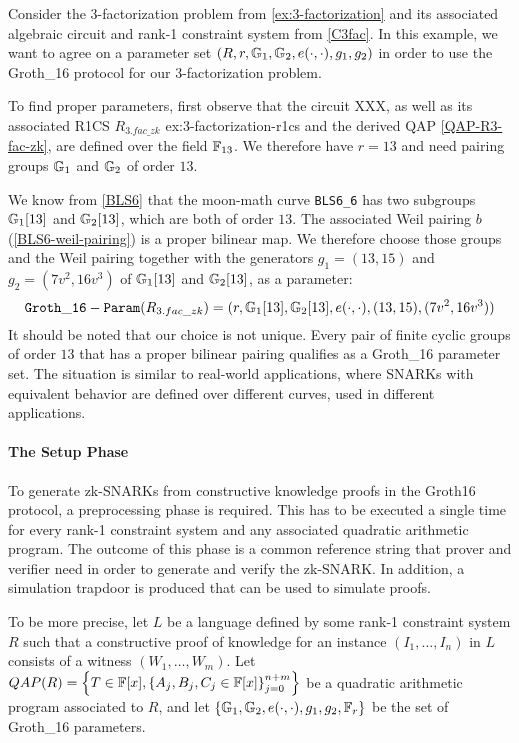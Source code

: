 \begin{example} Consider the $3$-factorization problem from \ref{ex:3-factorization} and its associated algebraic circuit and rank-1 constraint system from  \ref{C3fac}. In this example, we want to agree on a parameter set $(R,r, \mathbb{G}_1, \mathbb{G}_2, e(\cdot,\cdot), g_1,g_2)$ in order to use the Groth\_16 protocol for our $3$-factorization problem. 

To find proper parameters, first observe that the circuit XXX, as well as its associated R1CS $R_{3.fac\_zk}$ {ex:3-factorization-r1cs} and the derived QAP \ref{QAP-R3-fac-zk}, are defined over the field $\mathbb{F}_{13}$. We therefore have $r=13$ and need pairing groups $\mathbb{G}_1$ and $\mathbb{G}_2$ of order $13$. 

We know from \ref{BLS6} that the moon-math curve \texttt{BLS6\_6} has two subgroups $\mathbb{G}_1[13]$ and $\mathbb{G}_2[13]$, which are both of order $13$. The associated Weil pairing $b$ (\ref{BLS6-weil-pairing}) is a proper bilinear map. We therefore choose those groups and the Weil pairing together with the generators $g_1 = (13,15) $ and $g_2=(7v^2,16v^3)$ of $\mathbb{G}_1[13]$ and $\mathbb{G}_2[13]$, as a parameter:
$$
\mathtt{Groth\_16-Param}(R_{3.fac\_zk})=(r, \mathbb{G}_1[13], \mathbb{G}_2[13], e(\cdot,\cdot), (13,15),(7v^2,16v^3))
$$
It should be noted that our choice is not unique. Every pair of finite cyclic groups of order $13$ that has a proper bilinear pairing qualifies as a Groth\_16 parameter set. The situation is similar to real-world applications, where SNARKs with equivalent behavior are defined over different curves, used in different applications.
\end{example}
\paragraph{The Setup Phase} To generate zk-SNARKs from constructive knowledge proofs in the Groth16 protocol, a preprocessing phase is required. This has to be executed a single time for every rank-1 constraint system and any associated quadratic arithmetic program. The outcome of this phase is a common reference string that prover and verifier need in order to generate and verify the zk-SNARK. In addition, a simulation trapdoor is produced that can be used to simulate proofs.

To be more precise, let $L$ be a language defined by some rank-1 constraint system $R$ such that  a constructive proof of knowledge for an instance $(I_1,\ldots,I_n)$ in $L$ consists of a witness $(W_1,\ldots,W_m)$. Let $QAP(R) = \left\{T\in \mathbb{F}[x],\left\{A_j,B_j,C_j\in \mathbb{F}[x]\right\}_{j=0}^{n+m}\right\}$ be a quadratic arithmetic program associated to $R$, and let $\{\mathbb{G}_1, \mathbb{G}_2, e(\cdot,\cdot), g_1, g_2, \mathbb{F}_r\}$ be the set of Groth\_16 parameters.\label{groth16-parameters}

